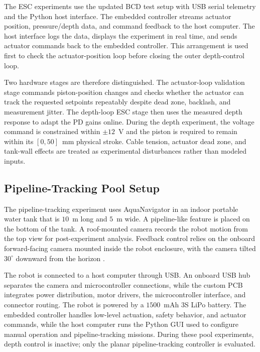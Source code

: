 \documentclass{uhcoethesis}
\begin{document}
The ESC experiments use the updated BCD test setup with USB serial telemetry and the Python host interface. The embedded controller streams actuator position, pressure/depth data, and command feedback to the host computer. The host interface logs the data, displays the experiment in real time, and sends actuator commands back to the embedded controller. This arrangement is used first to check the actuator-position loop before closing the outer depth-control loop.

Two hardware stages are therefore distinguished. The actuator-loop validation stage commands piston-position changes and checks whether the actuator can track the requested setpoints repeatably despite dead zone, backlash, and measurement jitter. The depth-loop ESC stage then uses the measured depth response to adapt the PD gains online. During the depth experiment, the voltage command is constrained within $\pm 12$~V and the piston is required to remain within its $[0,50]$~mm physical stroke. Cable tension, actuator dead zone, and tank-wall effects are treated as experimental disturbances rather than modeled inputs.

\subsection{Pipeline-Tracking Pool Setup}
\label{sec:ch3_pipeline_experimental_setup}

The pipeline-tracking experiment uses AquaNavigator in an indoor portable water tank that is $10$~m long and $5$~m wide. A pipeline-like feature is placed on the bottom of the tank. A roof-mounted camera records the robot motion from the top view for post-experiment analysis. Feedback control relies on the onboard forward-facing camera mounted inside the robot enclosure, with the camera tilted $30^\circ$ downward from the horizon \cite{Masood2025Pipeline}.

The robot is connected to a host computer through USB. An onboard USB hub separates the camera and microcontroller connections, while the custom PCB integrates power distribution, motor drivers, the microcontroller interface, and connector routing. The robot is powered by a $1500$~mAh 3S LiPo battery. The embedded controller handles low-level actuation, safety behavior, and actuator commands, while the host computer runs the Python GUI used to configure manual operation and pipeline-tracking missions. During these pool experiments, depth control is inactive; only the planar pipeline-tracking controller is evaluated.
\end{document}
